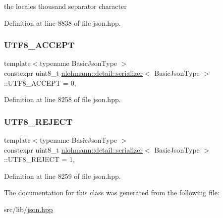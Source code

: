 the locale\textquotesingle{}s thousand separator character 



Definition at line 8838 of file json.\+hpp.

\mbox{\label{classnlohmann_1_1detail_1_1serializer_a52898111c3bbd130b2481dbef93c7292}} 
\subsubsection{\texorpdfstring{U\+T\+F8\+\_\+\+A\+C\+C\+E\+PT}{UTF8\_ACCEPT}}
{\footnotesize\ttfamily template$<$typename Basic\+Json\+Type $>$ \\
constexpr uint8\+\_\+t \hyperlink{classnlohmann_1_1detail_1_1serializer}{nlohmann\+::detail\+::serializer}$<$ Basic\+Json\+Type $>$\+::U\+T\+F8\+\_\+\+A\+C\+C\+E\+PT = 0\hspace{0.3cm}{\ttfamily [static]}, {\ttfamily [private]}}



Definition at line 8258 of file json.\+hpp.

\mbox{\label{classnlohmann_1_1detail_1_1serializer_a6bcc08c64319454fb9d72c3f438efee1}} 
\subsubsection{\texorpdfstring{U\+T\+F8\+\_\+\+R\+E\+J\+E\+CT}{UTF8\_REJECT}}
{\footnotesize\ttfamily template$<$typename Basic\+Json\+Type $>$ \\
constexpr uint8\+\_\+t \hyperlink{classnlohmann_1_1detail_1_1serializer}{nlohmann\+::detail\+::serializer}$<$ Basic\+Json\+Type $>$\+::U\+T\+F8\+\_\+\+R\+E\+J\+E\+CT = 1\hspace{0.3cm}{\ttfamily [static]}, {\ttfamily [private]}}



Definition at line 8259 of file json.\+hpp.



The documentation for this class was generated from the following file\+:\begin{DoxyCompactItemize}
\item 
src/lib/\hyperlink{json_8hpp}{json.\+hpp}\end{DoxyCompactItemize}
